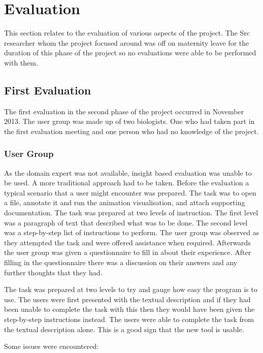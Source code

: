 \chapter{Evaluation}
\label{chap:eval}

This section relates to the evaluation of various aspects of the project.  The Src researcher whom the project focused around was off on maternity leave for the duration of this phase of the project so no evaluations were able to be performed with them.

\section{First Evaluation}

The first evaluation in the second phase of the project occurred in November 2013.  The user group was made up of two biologists.  One who had taken part in the first evaluation meeting and one person who had no knowledge of the project.

\subsection{User Group}

As the domain expert was not available, insight based evaluation was unable to be used.  A more traditional approach had to be taken.  Before the evaluation  a typical scenario that a user might encounter was prepared.  The task was to open a file, annotate it and run the animation visualisation, and attach supporting documentation.  The task was prepared at two levels of instruction.  The first level was a paragraph of text that described what was to be done.  The second level was a step-by-step list of instructions to perform.  The user group was observed as they attempted the task and were offered assistance when required.  Afterwards the user group was given a questionnaire to fill in about their experience. After filling in the questionnaire there was a discussion on their answers and any further thoughts that they had.

The task was prepared at two levels to try and gauge how easy the program is to use.  The users were first presented with the textual description and if they had been unable to complete the task with this then they would have been given the step-by-step instructions instead.  The users were able to complete the task from the textual description alone.  This is a good sign that the new tool is usable.

Some issues were encountered:

